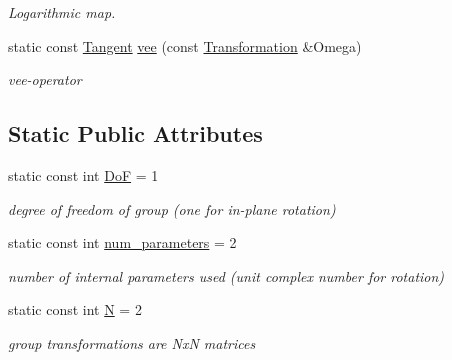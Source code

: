 \begin{DoxyCompactItemize}
\begin{DoxyCompactList}\small\item\em Logarithmic map. \end{DoxyCompactList}\item 
static const \hyperlink{class_sophus_1_1_s_o2_group_base_a3701d07bf2791675518a0ceb33ce653b}{Tangent} \hyperlink{class_sophus_1_1_s_o2_group_base_a08d1bf2d8cd13cd07734f67963d7fd16}{vee} (const \hyperlink{class_sophus_1_1_s_o2_group_base_a8981dccaf65802191e989815046b6a82}{Transformation} \&Omega)
\begin{DoxyCompactList}\small\item\em vee-\/operator \end{DoxyCompactList}\end{DoxyCompactItemize}
\subsection*{Static Public Attributes}
\begin{DoxyCompactItemize}
\item 
static const int \hyperlink{class_sophus_1_1_s_o2_group_base_aece4b1b66a60eee58224b3a89b8f47b1}{DoF} = 1\hypertarget{class_sophus_1_1_s_o2_group_base_aece4b1b66a60eee58224b3a89b8f47b1}{}\label{class_sophus_1_1_s_o2_group_base_aece4b1b66a60eee58224b3a89b8f47b1}

\begin{DoxyCompactList}\small\item\em degree of freedom of group (one for in-\/plane rotation) \end{DoxyCompactList}\item 
static const int \hyperlink{class_sophus_1_1_s_o2_group_base_a05f97013bff73cc09cdcaea0b2693664}{num\+\_\+parameters} = 2\hypertarget{class_sophus_1_1_s_o2_group_base_a05f97013bff73cc09cdcaea0b2693664}{}\label{class_sophus_1_1_s_o2_group_base_a05f97013bff73cc09cdcaea0b2693664}

\begin{DoxyCompactList}\small\item\em number of internal parameters used (unit complex number for rotation) \end{DoxyCompactList}\item 
static const int \hyperlink{class_sophus_1_1_s_o2_group_base_ab6b062ff165cf8f3c3d8deb09ff4cf0e}{N} = 2\hypertarget{class_sophus_1_1_s_o2_group_base_ab6b062ff165cf8f3c3d8deb09ff4cf0e}{}\label{class_sophus_1_1_s_o2_group_base_ab6b062ff165cf8f3c3d8deb09ff4cf0e}

\begin{DoxyCompactList}\small\item\em group transformations are NxN matrices \end{DoxyCompactList}\end{DoxyCompactItemize}


